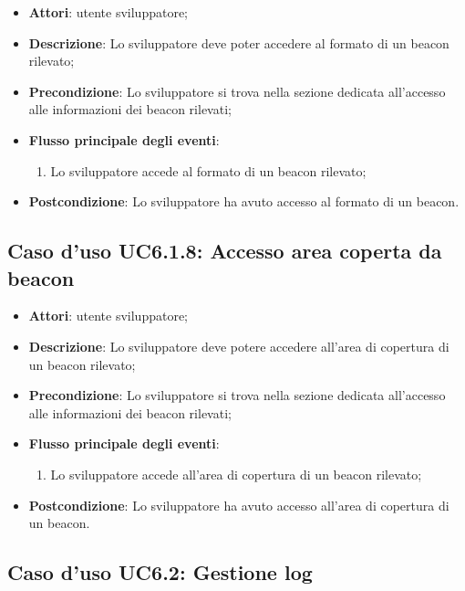 \documentclass[../AnalisiDeiRequisiti.tex]{subfiles}
\begin{document}
\begin{itemize}
\item \textbf{Attori}: utente sviluppatore;
\item \textbf{Descrizione}: Lo sviluppatore deve poter accedere al formato di un beacon rilevato; 
      \item \textbf{Precondizione}: Lo sviluppatore si trova nella sezione dedicata all'accesso alle informazioni dei beacon rilevati;

        \item \textbf{Flusso principale degli eventi}:
          \begin{enumerate}
          \item Lo sviluppatore accede al formato di un beacon rilevato;

      \end{enumerate}
    \item \textbf{Postcondizione}: Lo sviluppatore ha avuto accesso al formato di un beacon.
  \end{itemize}
\hypertarget{UC6.1.8}{}
\subsection{Caso d'uso UC6.1.8: Accesso area coperta da beacon}
\begin{itemize}
\item \textbf{Attori}: utente sviluppatore;
\item \textbf{Descrizione}: Lo sviluppatore deve potere accedere all’area di copertura di un beacon rilevato; 
      \item \textbf{Precondizione}: Lo sviluppatore si trova nella sezione dedicata all'accesso alle informazioni dei beacon rilevati;

        \item \textbf{Flusso principale degli eventi}:
          \begin{enumerate}
          \item Lo sviluppatore accede all’area di copertura di un beacon rilevato;

      \end{enumerate}
    \item \textbf{Postcondizione}: Lo sviluppatore ha avuto accesso all’area di copertura di un beacon.
  \end{itemize}
\hypertarget{UC6.2}{}
\subsection{Caso d'uso UC6.2: Gestione log}
\end{document}
